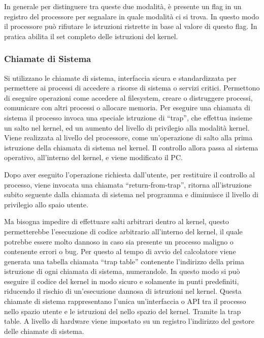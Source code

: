 \documentclass{article}
\numberwithin{equation}{subsection}
\begin{document}
In generale per distinguere tra queste due modalità, è presente un flag in un registro del processore per segnalare in quale modalità ci si trova. In questo modo il 
processore può rifiutare le istruzioni ristrette in base al valore di questo flag. In pratica abilita il set completo delle istruzioni del kernel. 

\subsubsection{Chiamate di Sistema}
\label{sec:sys-call}

Si utilizzano le chiamate di sistema, interfaccia sicura e standardizzata per permettere ai processi di accedere a risorse di sistema o servizi critici. Permettono di 
eseguire operazioni come accedere al filesystem, creare o distruggere processi, comunicare con altri processi o allocare memoria. Per eseguire una chiamata di sistema 
il processo invoca una speciale istruzione di ``trap'', che effettua insieme un salto nel kernel, ed un aumento del livello di privilegio alla modalità kernel. 
Viene realizzata al livello del processore, come un'operazione di salto alla prima istruzione della chiamata di sistema nel kernel. 
Il controllo allora passa al sistema operativo, all'interno del kernel, e viene modificato il PC. 

Dopo aver eseguito l'operazione richiesta dall'utente, per restituire il controllo al processo, viene invocata una chiamata ``return-from-trap'', ritorna all'istruzione 
subito seguente dalla chiamata di sistema nel programma e diminuisce il livello di privilegio allo spaio utente. 

Ma bisogna impedire di effettuare salti arbitrari dentro al kernel, questo permetterebbe l'esecuzione di codice arbitrario all'interno del kernel, il quale potrebbe 
essere molto dannoso in caso sia presente un processo maligno o contenente errori o bug. Per questo al tempo di avvio del calcolatore viene generata una tabella 
chiamata ``trap table'' contenente l'indirizzo della prima istruzione di ogni chiamata di sistema, numerandole. 
In questo modo si può eseguire il codice del kernel in modo sicuro e solamente in punti predefiniti, riducendo il rischio di un'esecuzione dannosa di istruzioni nel 
kernel. 
Questa chiamate di sistema rappresentano l'unica un'interfaccia o API tra il processo nello spazio utente e le istruzioni del nello spazio del kernel. Tramite la 
trap table. 
A livello di hardware viene impostato su un registro l'indirizzo del gestore delle chiamate di sistema. 
\end{document}
